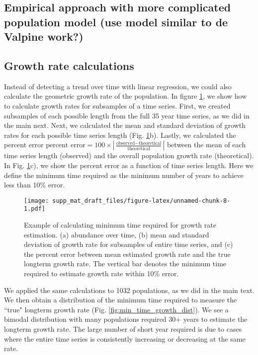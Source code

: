 \documentclass[12pt,]{article}
\begin{document}
\subsection{Empirical approach with more complicated population model
(use model similar to de Valpine
work?)}\label{empirical-approach-with-more-complicated-population-model-use-model-similar-to-de-valpine-work}

\subsection{Growth rate calculations}\label{growth-rate-calculations}

Instead of detecting a trend over time with linear regression, we could
also calculate the geometric growth rate of the population. In figure
\ref{fig:growth_rate}, we show how to calculate growth rates for
subsamples of a time series. First, we created subsamples of each
possible length from the full 35 year time series, as we did in the main
next. Next, we calculated the mean and standard deviation of growth
rates for each possible time series length (Fig.
\ref{fig:growth_rate}b). Lastly, we calculated the percent error
\(\mbox{percent error} = 100 \times \left| \frac{\mbox{observed} - \mbox{theoretical}}{\mbox{theoretical}} \right|\)
between the mean of each time series length (observed) and the overall
population growth rate (theoretical). In Fig. \ref{fig:growth_rate}c),
we show the percent error as a function of time series length. Here we
define the minimum time required as the minimum number of years to
achieve less than 10\% error.

\begin{figure}[htbp]
\centering
\texttt{[image: supp\_mat\_draft\_files/figure-latex/unnamed-chunk-8-1.pdf]}
\caption{Example of calculating minimum time required for growth rate
estimation. (a) abundance over time, (b) mean and standard deviation of
growth rate for subsamples of entire time series, and (c) the percent
error between mean estimated growth rate and the true longterm growth
rate. The vertical bar denotes the minimum time required to estimate
growth rate within 10\% error.\label{fig:growth_rate}}
\end{figure}

We applied the same calculations to 1032 populations, as we did in the
main text. We then obtain a distribution of the minimum time required to
measure the ``true" longterm growth rate (Fig.
\ref{fig:min_time_growth_dist}). We see a bimodal distribution with many
populations required 30+ years to estimate the longterm growth rate. The
large number of short year required is due to cases where the entire
time series is consistently increasing or decreasing at the same rate.
\end{document}
